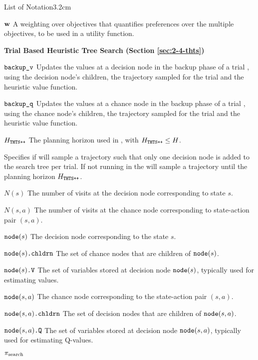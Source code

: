 \begin{mclistof}{List of Notation}{3.2cm}
    \item[$\mathbf{w}$] 
        A weighting over objectives that quantifies preferences over the multiple objectives, to be used in a utility function.
    \\
    \item[{\parbox[t]{\textwidth}{
        \Large\textbf{Trial Based Heuristic Tree Search (Section \ref{sec:2-4-thts})}\hfill\hfill
      }}]
    \item[${\textnormal{\texttt{backup\_v}}}$]
        Updates the values at a decision node in the backup phase of a trial \thtspp, using the decision node's children, the trajectory sampled for the trial and the heuristic value function.
    \item[${\textnormal{\texttt{backup\_q}}}$] 
        Updates the values at a chance node in the backup phase of a trial \thtspp, using the chance node's children, the trajectory sampled for the trial and the heuristic value function.
    \item[$H_{{\textnormal{\texttt{THTS++}}}}$]
        The planning horizon used in \thtspp, with $H_{{\textnormal{\texttt{THTS++}}}}\leq H$.
    \item[\mctsmode] 
        Specifies if \thtspp\ewe will sample a trajectory such that only one decision node is added to the search tree per trial. If not running in \mctsmode\ewe the \thtspp\ewe will sample a trajectory until the planning horizon $H_{{\textnormal{\texttt{THTS++}}}}$.
    \item[$N(s)$]
        The number of visits at the decision node corresponding to state $s$.
    \item[$N(s,a)$]
        The number of visits at the chance node corresponding to state-action pair $(s,a)$.
    \item[${\textnormal{\texttt{node}}}(s)$] 
        The decision node corresponding to the state $s$.
    \item[${\textnormal{\texttt{node}}}(s){\textnormal{\texttt{.chldrn}}}$]
        The set of chance nodes that are children of ${\textnormal{\texttt{node}}}(s)$.
    \item[${{\textnormal{\texttt{node}}}(s)\textnormal{\texttt{.V}}}$]
        The set of variables stored at decision node ${\textnormal{\texttt{node}}}(s)$, typically used for estimating values.
    \item[${\textnormal{\texttt{node}}}(s,a)$] 
        The chance node corresponding to the state-action pair $(s,a)$.
    \item[${\textnormal{\texttt{node}}}(s,a){\textnormal{\texttt{.chldrn}}}$]
        The set of decision nodes that are children of ${\textnormal{\texttt{node}}}(s,a)$.
    \item[${{\textnormal{\texttt{node}}}(s,a)\textnormal{\texttt{.Q}}}$] 
        The set of variables stored at decision node ${\textnormal{\texttt{node}}}(s,a)$, typically used for estimating Q-values.
    \item[${\pi_{\textnormal{search}}}$]

\end{mclistof}
